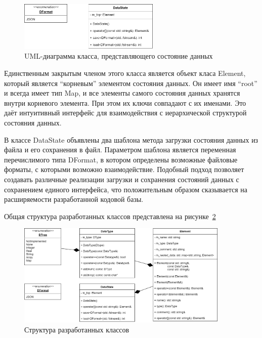 \begin{figure}[!ht]
    \centering
    \includegraphics[width=0.6\textwidth]{figures/UML.datastate.png}
    \caption{UML-диаграмма класса, представляющего состояние данных}
    \label{fig:UMLDatastate}
\end{figure}

Единственным закрытым членом этого класса является объект класа \textsf{Element}, который является ``корневым'' элементом состояния данных. Он имеет имя ``root'' и всегда имеет тип \textsf{Map}, и все элементы самого состояния данных хранятся внутри корневого элемента. При этом их ключи совпадают с их именами. Это даёт интуитивный интерфейс для взаимодействия с иерархической структурой состояния данных.

В классе \textsf{DataState} объявлены два шаблона метода загрузки состояния данных из файла и его сохранения в файл. Параметром шаблона является переменная перечислимого типа \textsf{DFormat}, в котором определены возможные файловые форматы, с которыми возможно взаимодействие. Подобный подход позволяет создавать различные реализации загрузки и сохранения состояний данных с сохранением единого интерфейса, что положительным образом сказывается на расширяемости разработанной кодовой базы.

Общая структура разработанных классов представлена на рисунке~\ref{fig:UMLAll}
\begin{figure}[!ht]
    \centering
    \includegraphics[width=0.9\textwidth]{figures/UML.all.png}
    \caption{Структура разработанных классов}
    \label{fig:UMLAll}
\end{figure}


